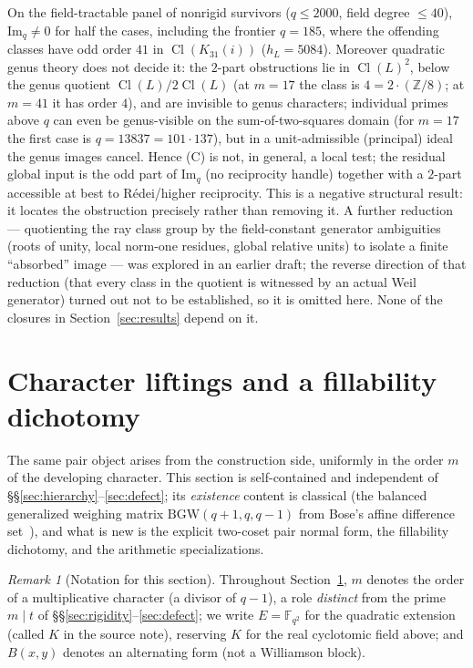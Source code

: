 \documentclass[11pt]{article}
\theoremstyle{plain}
\theoremstyle{definition}
\theoremstyle{remark}
\newtheorem{remark}[theorem]{Remark}
\newcommand{\Z}{\mathbb Z}
\newcommand{\F}{\mathbb F}
\newcommand{\Cl}{\operatorname{Cl}}
\begin{document}
On the field-tractable panel of nonrigid survivors ($q\le2000$, field degree
$\le40$), $\mathrm{Im}_q\ne0$ for half the cases, including the frontier
$q=185$, where the offending classes have odd order $41$ in $\Cl(K_{31}(i))$
($h_L=5084$). Moreover quadratic genus theory does not decide it: the $2$-part
obstructions lie in $\Cl(L)^2$, below the genus quotient $\Cl(L)/2\Cl(L)$
(at $m=17$ the class is $4=2\cdot(\Z/8)$; at $m=41$ it has order $4$), and are
invisible to genus characters; individual primes above $q$ can even be
genus-visible on the sum-of-two-squares domain (for $m=17$ the first case is
$q=13837=101\cdot137$), but in a unit-admissible (principal) ideal the genus
images cancel. Hence (C) is not, in general, a local test; the residual global
input is the odd part of $\mathrm{Im}_q$ (no reciprocity handle) together with a
$2$-part accessible at best to R\'edei/higher reciprocity. This is a negative
structural result: it locates the obstruction precisely rather than removing it.
A further reduction --- quotienting the ray class group by the field-constant
generator ambiguities (roots of unity, local norm-one residues, global relative
units) to isolate a finite ``absorbed'' image --- was explored in an earlier
draft; the reverse direction of that reduction (that every class in the
quotient is witnessed by an actual Weil generator) turned out not to be
established, so it is omitted here. None of the closures in
Section~\ref{sec:results} depend on it.

\section{Character liftings and a fillability dichotomy}
\label{sec:mary}

The same pair object arises from the construction side, uniformly in the order
$m$ of the developing character. This section is self-contained and independent
of \S\S\ref{sec:hierarchy}--\ref{sec:defect}; its \emph{existence} content is
classical (the balanced generalized weighing matrix
$\mathrm{BGW}(q+1,q,q-1)$ from Bose's affine difference
set~\cite{Bose42,Jungnickel82,JK}), and what is new is the explicit two-coset
pair normal form, the fillability dichotomy, and the arithmetic specializations.

\begin{remark}[Notation for this section]\label{rem:maryscope}
Throughout Section~\ref{sec:mary}, $m$ denotes the order of a multiplicative
character (a divisor of $q-1$), a role \emph{distinct} from the prime $m\mid t$
of \S\S\ref{sec:rigidity}--\ref{sec:defect}; we write $E=\F_{q^2}$ for the
quadratic extension (called $K$ in the source note), reserving $K$ for the real
cyclotomic field above; and $B(x,y)$ denotes an alternating form (not a
Williamson block).
\end{remark}
\end{document}
